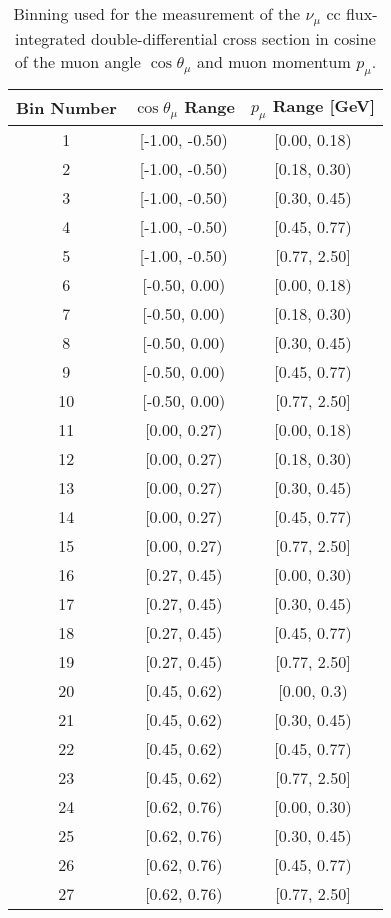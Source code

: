 \begin{table}[]
\caption[Double-Differential Cross-Section Binning]{Binning used for the measurement of the $\nu_\mu$ \acrshort{cc} flux-integrated double-differential cross section in cosine of the muon angle $\cos\theta_\mu$ and muon momentum $p_\mu$.}
\label{tab:xsec_meangle_mumom_binning}
\centering
\begin{tabular}{ccc}
\toprule
Bin Number & $\cos\theta_\mu$ Range & $p_\mu$ Range [GeV] \\
\midrule
1 & [-1.00,  -0.50) & [0.00,  0.18)\\
2 & [-1.00,  -0.50) & [0.18,  0.30)\\
3 & [-1.00,  -0.50) & [0.30,  0.45)\\
4 & [-1.00,  -0.50) & [0.45,  0.77)\\
5 & [-1.00,  -0.50) & [0.77,  2.50] \\
6 & [-0.50,  0.00) & [0.00,  0.18)\\
7 & [-0.50,  0.00) & [0.18,  0.30)\\
8 & [-0.50,  0.00) & [0.30,  0.45)\\
9 & [-0.50,  0.00) & [0.45,  0.77)\\
10 & [-0.50,  0.00) & [0.77,  2.50] \\
11 & [0.00,  0.27) & [0.00,  0.18) \\
12 & [0.00,  0.27) & [0.18,  0.30)\\
13 & [0.00,  0.27) & [0.30,  0.45)\\
14 & [0.00,  0.27) & [0.45,  0.77)\\
15 & [0.00,  0.27) & [0.77,  2.50]  \\
16 & [0.27,  0.45) & [0.00,  0.30)\\
17 & [0.27,  0.45) & [0.30,  0.45)\\
18 & [0.27,  0.45) & [0.45,  0.77)\\
19 & [0.27,  0.45) & [0.77,  2.50]  \\
20 & [0.45,  0.62) & [0.00,  0.3)\\
21 & [0.45,  0.62) & [0.30,  0.45)\\
22 & [0.45,  0.62) & [0.45,  0.77)\\
23 & [0.45,  0.62) & [0.77,  2.50] \\
24 & [0.62,  0.76) & [0.00,  0.30) \\
25 & [0.62,  0.76) & [0.30,  0.45)\\
26 & [0.62,  0.76) & [0.45,  0.77)\\
27 & [0.62,  0.76) & [0.77,  2.50] \\

\end{tabular}
\end{table}
